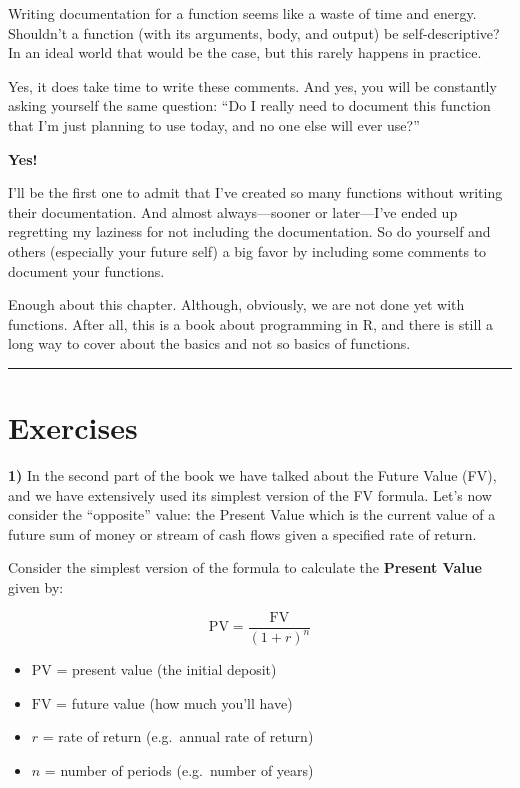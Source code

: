 \documentclass[
]{book}
\begin{document}
Writing documentation for a function seems like a waste of time and energy.
Shouldn't a function (with its arguments, body, and output) be
self-descriptive? In an ideal world that would be the case, but this rarely
happens in practice.

Yes, it does take time to write these comments. And yes, you will be constantly
asking yourself the same question: ``Do I really need to document this function
that I'm just planning to use today, and no one else will ever use?''

\textbf{Yes!}

I'll be the first one to admit that I've created so many functions without
writing their documentation. And almost always---sooner or later---I've ended
up regretting my laziness for not including the documentation.
So do yourself and others (especially your future self) a big favor by
including some comments to document your functions.

Enough about this chapter. Although, obviously, we are not done yet with
functions. After all, this is a book about programming in R, and there is still
a long way to cover about the basics and not so basics of functions.

\begin{center}\rule{0.5\linewidth}{0.5pt}\end{center}

\hypertarget{exercises-7}{%
\section{Exercises}\label{exercises-7}}

\textbf{1)} In the second part of the book we have talked about the Future Value (FV),
and we have extensively used its simplest version of the FV formula. Let's now
consider the ``opposite'' value: the Present Value which is the current value of a
future sum of money or stream of cash flows given a specified rate of return.

Consider the simplest version of the formula to calculate the
\textbf{Present Value} given by:

\[
\text{PV} = \frac{\text{FV}}{(1 + r)^n}
\]

\begin{itemize}
\item
  \(\text{PV}\) = present value (the initial deposit)
\item
  \(\text{FV}\) = future value (how much you'll have)
\item
  \(r\) = rate of return (e.g.~annual rate of return)
\item
  \(n\) = number of periods (e.g.~number of years)
\end{itemize}
\end{document}
